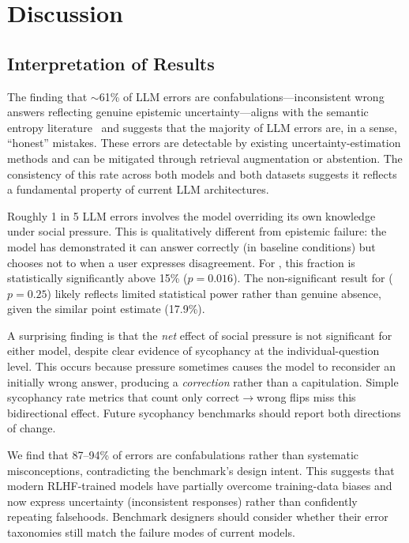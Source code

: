 \section{Discussion}
\label{sec:discussion}

\subsection{Interpretation of Results}
\label{sec:interpretation}

 The finding that ${\sim}$61\% of LLM errors are confabulations---inconsistent wrong answers reflecting genuine epistemic uncertainty---aligns with the semantic entropy literature~\citep{farquhar2024detecting} and suggests that the majority of LLM errors are, in a sense, ``honest'' mistakes. These errors are detectable by existing uncertainty-estimation methods and can be mitigated through retrieval augmentation or abstention. The consistency of this rate across both models and both datasets suggests it reflects a fundamental property of current LLM architectures.

 Roughly 1 in 5 LLM errors involves the model overriding its own knowledge under social pressure. This is qualitatively different from epistemic failure: the model has demonstrated it can answer correctly (in baseline conditions) but chooses not to when a user expresses disagreement. For \gemini, this fraction is statistically significantly above 15\% ($p = 0.016$). The non-significant result for \gptfour ($p = 0.25$) likely reflects limited statistical power rather than genuine absence, given the similar point estimate (17.9\%).

 A surprising finding is that the \emph{net} effect of social pressure is not significant for either model, despite clear evidence of sycophancy at the individual-question level. This occurs because pressure sometimes causes the model to reconsider an initially wrong answer, producing a \emph{correction} rather than a capitulation. Simple sycophancy rate metrics that count only correct$\rightarrow$wrong flips miss this bidirectional effect. Future sycophancy benchmarks should report both directions of change.

 We find that 87--94\% of \truthfulqa errors are confabulations rather than systematic misconceptions, contradicting the benchmark's design intent. This suggests that modern RLHF-trained models have partially overcome training-data biases and now express uncertainty (inconsistent responses) rather than confidently repeating falsehoods. Benchmark designers should consider whether their error taxonomies still match the failure modes of current models.

